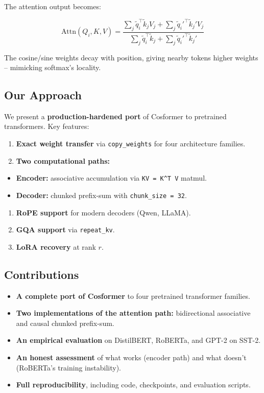 The attention output becomes:

\begin{equation}
\text{Attn}(Q_i, K, V) = \frac{\sum_j \tilde{q}_i^\top \tilde{k}_j V_j + \sum_j \tilde{q}_i'^\top \tilde{k}_j' V_j}{\sum_j \tilde{q}_i^\top \tilde{k}_j + \sum_j \tilde{q}_i'^\top \tilde{k}_j'}
\end{equation}

The cosine/sine weights decay with position, giving nearby tokens higher 
weights -- mimicking softmax's locality.

\subsection{Our Approach}

We present a \textbf{production-hardened port} of Cosformer to pretrained 
transformers. Key features:

\begin{enumerate}
\item \textbf{Exact weight transfer} via \texttt{copy\_weights} for four architecture families.
\item \textbf{Two computational paths:}
\end{enumerate}
\begin{itemize}
\item \textbf{Encoder:} associative accumulation via \texttt{KV = K\^{}T V} matmul.
\item \textbf{Decoder:} chunked prefix-sum with \texttt{chunk\_size = 32}.
\end{itemize}
\begin{enumerate}
\item \textbf{RoPE support} for modern decoders (Qwen, LLaMA).
\item \textbf{GQA support} via \texttt{repeat\_kv}.
\item \textbf{LoRA recovery} at rank $r$.

\end{enumerate}
\subsection{Contributions}

\begin{itemize}
\item \textbf{A complete port of Cosformer} to four pretrained transformer families.
\item \textbf{Two implementations of the attention path:} bidirectional associative
  and causal chunked prefix-sum.
\item \textbf{An empirical evaluation} on DistilBERT, RoBERTa, and GPT-2 on SST-2.
\item \textbf{An honest assessment} of what works (encoder path) and what doesn't
  (RoBERTa's training instability).
\item \textbf{Full reproducibility}, including code, checkpoints, and evaluation scripts.

\end{itemize}
